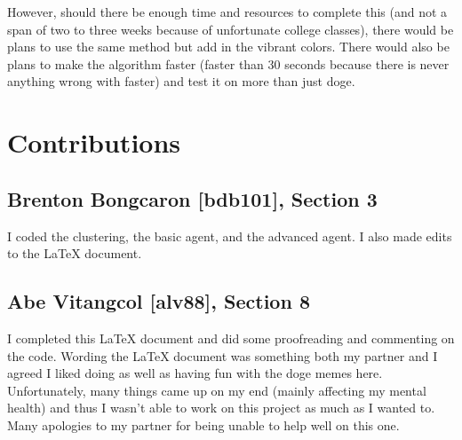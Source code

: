 \documentclass[11pt]{article}
\begin{document}
However, should there be enough time and resources to complete this (and not a span of two to three weeks because of unfortunate college classes), there would be plans to use the same method but add in the vibrant colors. There would also be plans to make the algorithm faster (faster than 30 seconds because there is never anything wrong with faster) and test it on more than just doge.

\section{Contributions}
\subsection*{Brenton Bongcaron [bdb101], Section 3}
I coded the clustering, the basic agent, and the advanced agent. I also made edits to the \LaTeX\: document.
\subsection*{Abe Vitangcol [alv88], Section 8}
I completed this \LaTeX\: document and did some proofreading and commenting on the code. Wording the \LaTeX\: document was something both my partner and I agreed I liked doing as well as having fun with the doge memes here. Unfortunately, many things came up on my end (mainly affecting my mental health) and thus I wasn't able to work on this project as much as I wanted to. Many apologies to my partner for being unable to help well on this one.
\end{document}
